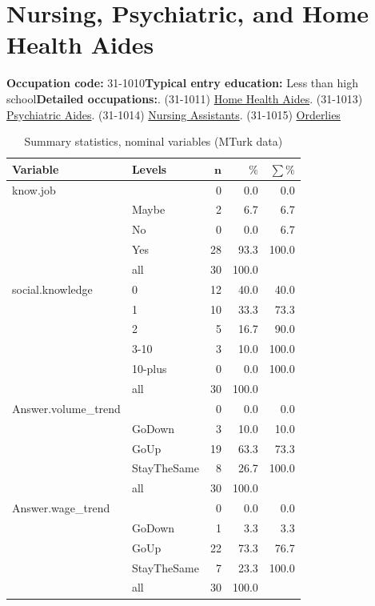 \documentclass[a4paper,10pt]{article}\usepackage[]{graphicx}\usepackage[]{color}
\begin{document}
\newpage\section{Nursing, Psychiatric, and Home Health Aides}\textbf{Occupation code:} 31-1010\newline\textbf{Typical entry education:} Less than high school\newline\textbf{Detailed occupations:}. (31-1011)  \href{http://www.bls.gov/oes/current/oes311011.htm}{Home Health Aides}. (31-1013)  \href{http://www.bls.gov/oes/current/oes311013.htm}{Psychiatric Aides}. (31-1014)  \href{http://www.bls.gov/oes/current/oes311014.htm}{Nursing Assistants}. (31-1015)  \href{http://www.bls.gov/oes/current/oes311015.htm}{Orderlies}\newline%
\begin{table}[ht]
\centering
{\footnotesize
\begin{tabular}{ll|rrr}
 \textbf{Variable} & \textbf{Levels} & $\mathbf{n}$ & $\mathbf{\%}$ & $\mathbf{\sum \%}$ \\ 
  \hline
know.job &  & 0 & 0.0 & 0.0 \\ 
   & Maybe & 2 & 6.7 & 6.7 \\ 
   & No & 0 & 0.0 & 6.7 \\ 
   & Yes & 28 & 93.3 & 100.0 \\ 
   \hline
 & all & 30 & 100.0 &  \\ 
   \hline
\hline
social.knowledge & 0 & 12 & 40.0 & 40.0 \\ 
   & 1 & 10 & 33.3 & 73.3 \\ 
   & 2 & 5 & 16.7 & 90.0 \\ 
   & 3-10 & 3 & 10.0 & 100.0 \\ 
   & 10-plus & 0 & 0.0 & 100.0 \\ 
   \hline
 & all & 30 & 100.0 &  \\ 
   \hline
\hline
Answer.volume\_trend &  & 0 & 0.0 & 0.0 \\ 
   & GoDown & 3 & 10.0 & 10.0 \\ 
   & GoUp & 19 & 63.3 & 73.3 \\ 
   & StayTheSame & 8 & 26.7 & 100.0 \\ 
   \hline
 & all & 30 & 100.0 &  \\ 
   \hline
\hline
Answer.wage\_trend &  & 0 & 0.0 & 0.0 \\ 
   & GoDown & 1 & 3.3 & 3.3 \\ 
   & GoUp & 22 & 73.3 & 76.7 \\ 
   & StayTheSame & 7 & 23.3 & 100.0 \\ 
   \hline
 & all & 30 & 100.0 &  \\ 
   \hline
\hline
\end{tabular}
}
\caption{Summary statistics, nominal variables (MTurk data)} 
\label{tab1:31-1010}
\end{table}
\end{document}
